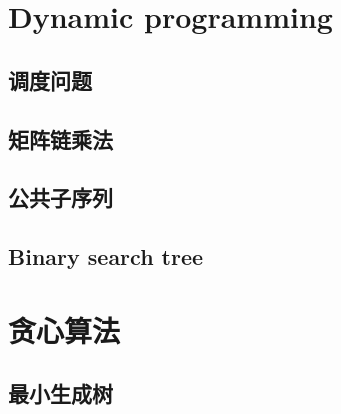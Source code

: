 \documentclass[oneside,12pt,twiside,a4paper]{ctexbook}
\begin{document}
\chapter{Dynamic programming}
\section{调度问题}
\section{矩阵链乘法}
\section{公共子序列}
\section{Binary search tree}

%
\chapter{贪心算法}
\section{最小生成树}
\end{document}
